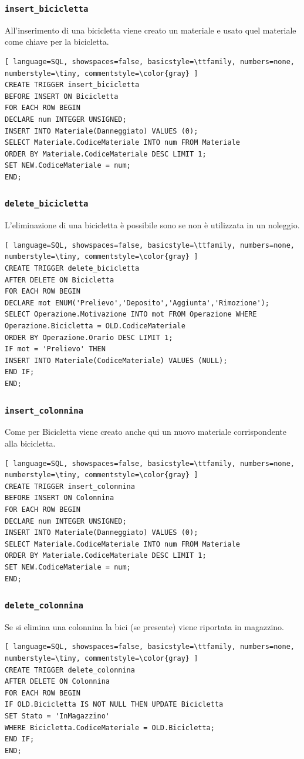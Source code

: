 \documentclass[a4paper,twoside]{article}
\begin{document}
\subsubsection{\texttt{insert\_bicicletta}}
All'inserimento di una bicicletta viene creato un materiale e usato quel materiale come chiave per la bicicletta.
\begin{lstlisting}[ language=SQL, showspaces=false, basicstyle=\ttfamily, numbers=none, numberstyle=\tiny, commentstyle=\color{gray} ]
CREATE TRIGGER insert_bicicletta
BEFORE INSERT ON Bicicletta
FOR EACH ROW BEGIN
DECLARE num INTEGER UNSIGNED;
INSERT INTO Materiale(Danneggiato) VALUES (0);
SELECT Materiale.CodiceMateriale INTO num FROM Materiale
ORDER BY Materiale.CodiceMateriale DESC LIMIT 1;
SET NEW.CodiceMateriale = num;
END;
\end{lstlisting}
\subsubsection{\texttt{delete\_bicicletta}}
L'eliminazione di una bicicletta è possibile sono se non è utilizzata in un noleggio.
\begin{lstlisting}[ language=SQL, showspaces=false, basicstyle=\ttfamily, numbers=none, numberstyle=\tiny, commentstyle=\color{gray} ]
CREATE TRIGGER delete_bicicletta
AFTER DELETE ON Bicicletta
FOR EACH ROW BEGIN
DECLARE mot ENUM('Prelievo','Deposito','Aggiunta','Rimozione');
SELECT Operazione.Motivazione INTO mot FROM Operazione WHERE
Operazione.Bicicletta = OLD.CodiceMateriale
ORDER BY Operazione.Orario DESC LIMIT 1;
IF mot = 'Prelievo' THEN
INSERT INTO Materiale(CodiceMateriale) VALUES (NULL);
END IF;
END;
\end{lstlisting}
\subsubsection{\texttt{insert\_colonnina}}
Come per Bicicletta viene creato anche qui un nuovo materiale corrispondente alla bicicletta.
\begin{lstlisting}[ language=SQL, showspaces=false, basicstyle=\ttfamily, numbers=none, numberstyle=\tiny, commentstyle=\color{gray} ]
CREATE TRIGGER insert_colonnina
BEFORE INSERT ON Colonnina
FOR EACH ROW BEGIN
DECLARE num INTEGER UNSIGNED;
INSERT INTO Materiale(Danneggiato) VALUES (0);
SELECT Materiale.CodiceMateriale INTO num FROM Materiale
ORDER BY Materiale.CodiceMateriale DESC LIMIT 1;
SET NEW.CodiceMateriale = num;
END;
\end{lstlisting}
\subsubsection{\texttt{delete\_colonnina}}
Se si elimina una colonnina la bici (se presente) viene riportata in magazzino.
\begin{lstlisting}[ language=SQL, showspaces=false, basicstyle=\ttfamily, numbers=none, numberstyle=\tiny, commentstyle=\color{gray} ]
CREATE TRIGGER delete_colonnina
AFTER DELETE ON Colonnina
FOR EACH ROW BEGIN
IF OLD.Bicicletta IS NOT NULL THEN UPDATE Bicicletta
SET Stato = 'InMagazzino'
WHERE Bicicletta.CodiceMateriale = OLD.Bicicletta;
END IF;
END;
\end{lstlisting}
\end{document}
